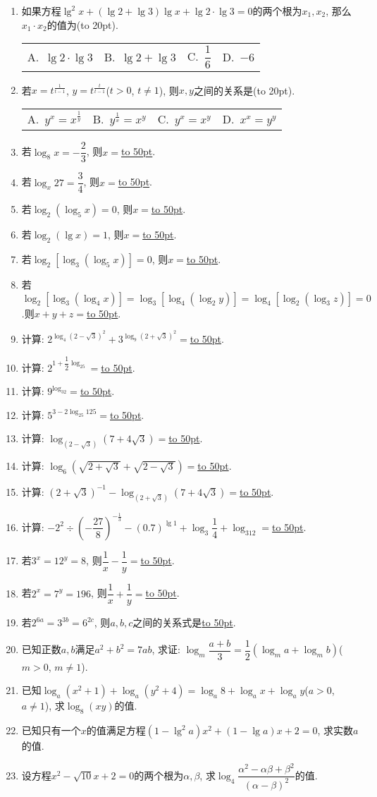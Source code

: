 \documentclass[10pt,a4paper]{article}
\newcommand{\blank}[1]{\underline{\hbox to #1pt{}}}
\newcommand{\bracket}[1]{(\hbox to #1pt{})}
\newcommand{\fourch}[4]{\par\begin{tabular}{p{.23\textwidth}p{.23\textwidth}p{.23\textwidth}p{.23\textwidth}}
A.~#1 &B.~#2& C.~#3& D.~#4
\end{tabular}}
\begin{document}
\begin{enumerate}[1.]
\item 如果方程$\lg ^2x+(\lg 2+\lg 3)\lg x+\lg 2\cdot \lg 3=0$的两个根为$x_1,x_2$, 那么$x_1\cdot x_2$的值为\bracket{20}.
\fourch{$\lg 2\cdot \lg 3$}{$\lg 2+\lg 3$}{$\dfrac 16$}{$-6$}
\item 若$x=t^{\frac 1{t-1}}$, $y=t^{\frac t{t-1}}$($t>0$, $t\ne 1$), 则$x,y$之间的关系是\bracket{20}.
\fourch{$y^x=x^{\frac 1y}$}{$y^{\frac 1x}=x^y$}{$y^x=x^y$}{$x^x=y^y$}
\item 若$\log_8x=-\dfrac 23$, 则$x=$\blank{50}.
\item 若$\log_x27=\dfrac 34$, 则$x=$\blank{50}.
\item 若$\log_2(\log_5x)=0$, 则$x=$\blank{50}.
\item 若$\log_2(\lg x)=1$, 则$x=$\blank{50}.
\item 若$\log_2[\log_3(\log_5x)]=0$, 则$x=$\blank{50}.
\item 若$\log_2[\log_3(\log_4x)]=\log_3[\log_4(\log_2y)]=\log_4[\log_2(\log_3z)]=0$.则$x+y+z=$\blank{50}.
\item 计算: $2^{\log_4(2-\sqrt 3)^2}+3^{\log_9(2+\sqrt 3)^2}=$\blank{50}.
\item 计算: $2^{1+\dfrac 12\log_25}=$\blank{50}.
\item 计算: $9^{\log_32}=$\blank{50}.
\item 计算: $5^{3-2\log_{25}125}=$\blank{50}.
\item 计算: $\log_{(2-\sqrt 3)}(7+4\sqrt 3)=$\blank{50}.
\item 计算: $\log_6(\sqrt {2+\sqrt 3}+\sqrt {2-\sqrt 3})=$\blank{50}.
\item 计算: $(2+\sqrt 3)^{-1}-\log_{(2+\sqrt 3)}(7+4\sqrt 3)=$\blank{50}.
\item 计算: $-2^2\div (-\dfrac{27}8)^{-\frac 13}-(0.7)^{\lg 1}+\log_3\dfrac 14+\log_312=$\blank{50}.
\item 若$3^x=12^y=8$, 则$\dfrac 1x-\dfrac 1y=$\blank{50}.
\item 若$2^x=7^y=196$, 则$\dfrac 1x+\dfrac 1y=$\blank{50}.
\item 若$2^{6a}=3^{3b}=6^{2c}$, 则$a,b,c$之间的关系式是\blank{50}.
\item 已知正数$a,b$满足$a^2+b^2=7ab$, 求证: $\log_m\dfrac{a+b}3=\dfrac 12(\log_ma+\log_mb)$($m>0$, $m\ne 1$).
\item 已知$\log_a(x^2+1)+\log_a(y^2+4)=\log_a8+\log_ax+\log_ay$($a>0$, $a\ne 1$), 求$\log_8(xy)$的值.
\item 已知只有一个$x$的值满足方程$(1-\lg ^2a)x^2+(1-\lg a)x+2=0$, 求实数$a$的值.
\item 设方程$x^2-\sqrt {10}x+2=0$的两个根为$\alpha ,\beta$, 求$\log_4\dfrac{\alpha ^2-\alpha \beta +\beta ^2}{(\alpha -\beta)^2}$的值.

\end{enumerate}
\end{document}
